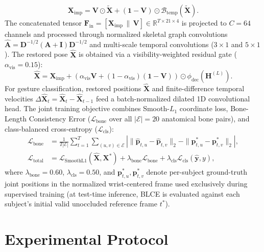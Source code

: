 \documentclass[10pt,twocolumn]{article}
\begin{document}
\begin{equation}
\mathbf{X}_{\text{imp}} = \mathbf{V} \odot \tilde{\mathbf{X}} + (\mathbf{1} - \mathbf{V}) \odot \mathcal{B}_{\text{temp}}(\tilde{\mathbf{X}}).
\end{equation}
The concatenated tensor $\mathbf{F}_{\text{in}} = [\mathbf{X}_{\text{imp}} \,\|\, \mathbf{V}] \in \mathbb{R}^{T \times 21 \times 4}$ is projected to $C=64$ channels and processed through normalized skeletal graph convolutions $\hat{\mathbf{A}} = \mathbf{D}^{-1/2}(\mathbf{A}+\mathbf{I})\mathbf{D}^{-1/2}$ \cite{yan2018spatial,li2021spatio} and multi-scale temporal convolutions ($3\times 1$ and $5\times 1$). The restored pose $\hat{\mathbf{X}}$ is obtained via a visibility-weighted residual gate ($\alpha_{\text{vis}} = 0.15$):
\begin{equation}
\hat{\mathbf{X}} = \mathbf{X}_{\text{imp}} + \left(\alpha_{\text{vis}}\mathbf{V} + (1-\alpha_{\text{vis}})(\mathbf{1}-\mathbf{V})\right) \odot \phi_{\text{dec}}(\mathbf{H}^{(L)}).
\end{equation}
For gesture classification, restored positions $\hat{\mathbf{X}}$ and finite-difference temporal velocities $\Delta\hat{\mathbf{X}}_t = \hat{\mathbf{X}}_t - \hat{\mathbf{X}}_{t-1}$ feed a batch-normalized dilated 1D convolutional head. The joint training objective combines Smooth-$L_1$ coordinate loss, Bone-Length Consistency Error ($\mathcal{L}_{\text{bone}}$ over all $|\mathcal{E}|=20$ anatomical bone pairs), and class-balanced cross-entropy ($\mathcal{L}_{\text{cls}}$):
\begin{align}
\mathcal{L}_{\text{bone}} &= \frac{1}{T|\mathcal{E}|} \sum_{t=1}^{T} \sum_{(u,v)\in\mathcal{E}} \left| \|\hat{\mathbf{p}}_{t,u} - \hat{\mathbf{p}}_{t,v}\|_2 - \|\mathbf{p}^*_{t,u} - \mathbf{p}^*_{t,v}\|_2 \right|, \\
\mathcal{L}_{\text{total}} &= \mathcal{L}_{\text{SmoothL1}}(\hat{\mathbf{X}}, \mathbf{X}^*) + \lambda_{\text{bone}}\mathcal{L}_{\text{bone}} + \lambda_{\text{cls}}\mathcal{L}_{\text{cls}}(\hat{\mathbf{y}}, y),
\end{align}
where $\lambda_{\text{bone}} = 0.60$, $\lambda_{\text{cls}} = 0.50$, and $\mathbf{p}^*_{t,u}, \mathbf{p}^*_{t,v}$ denote per-subject ground-truth joint positions in the normalized wrist-centered frame used exclusively during supervised training (at test-time inference, BLCE is evaluated against each subject's initial valid unoccluded reference frame $t^*$).

\section{Experimental Protocol}
\end{document}
